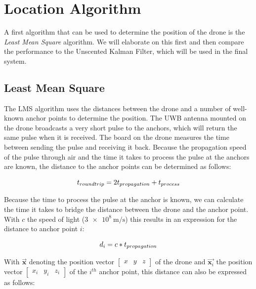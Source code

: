 \documentclass[a4paper]{article}        %
\begin{document}
		



\section{Location Algorithm}
	A first algorithm that can be used to determine the position of the drone is the \textit{Least Mean Square} algorithm. We will elaborate on this first and then compare the performance to the Unscented Kalman Filter, which will be used in the final system. 

	\subsection{Least Mean Square}
	\label{subsec:LMS}

		The LMS algorithm uses the distances between the drone and a number of well-known anchor points to determine the position. The UWB antenna mounted on the drone broadcasts a very short pulse to the anchors, which will return the same pulse when it is received. The board on the drone measures the time between sending the pulse and receiving it back. Because the propagation speed of the pulse through air and the time it takes to process the pulse at the anchors are known, the distance to the anchor points can be determined as follows:

		\begin{equation}
		\centering
			t_{roundtrip} = 2t_{propagation} + t_{process}
		\end{equation} 

		Because the time to process the pulse at the anchor is known, we can calculate the time it takes to bridge the distance between the drone and the anchor point. With $c$ the speed of light ($\SI{3e8}{\meter\per\second}$) this results in an expression for the distance to anchor point $i$:

		\begin{equation}
		\centering
			d_i = c*t_{propagation}
		\end{equation}

		With $\vec{\textbf{x}}$ denoting the position vector $\begin{bmatrix} x & y & z \end{bmatrix}$ of the drone and $\vec{\textbf{x}_i}$ the position vector $\begin{bmatrix} x_i & y_i & z_i \end{bmatrix}$ of the $i^{th}$ anchor point, this distance can also be expressed as follows:
\end{document}

